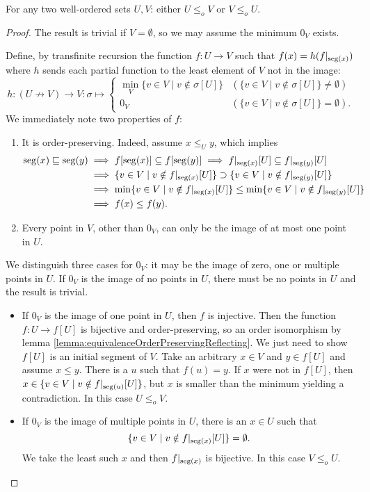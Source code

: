 \begin{theorem}\label{theorem:comparabilityWosets}
For any two well-ordered sets $U,V$: either $U\leq_o V$ or $V\leq_o U$.
\end{theorem}
\begin{proof}
The result is trivial if $V=\emptyset$, so we may assume the minimum $0_V$ exists.

Define, by transfinite recursion the function $f:U\to V$ such that $f(x) = h(f|_{\operatorname{seg}(x)})$ where $h$ sends each partial function to the least element of $V$ not in the image:
\[ h: (U\not\to V) \to V: \sigma \mapsto \begin{cases}
\min_V\{v\in V\;|\; v\notin \sigma[U]\} & (\{v\in V\;|\; v\notin \sigma[U]\} \neq \emptyset) \\
0_V  & (\{v\in V\;|\; v\notin \sigma[U]\} = \emptyset).
\end{cases} \]
We immediately note two properties of $f$:
\begin{enumerate}
\item It is order-preserving. Indeed, assume $x\leq_U y$, which implies
\begin{align*}
\operatorname{seg}(x) \sqsubseteq \operatorname{seg}(y) &\implies f[\operatorname{seg}(x)] \subseteq f[\operatorname{seg}(y)] \implies f|_{\operatorname{seg}(x)}[U] \subseteq f|_{\operatorname{seg}(y)}[U] \\
&\implies \{v\in V\;|\; v\notin f|_{\operatorname{seg}(x)}[U]\} \supset \{v\in V\;|\; v\notin f|_{\operatorname{seg}(y)}[U]\} \\
&\implies \min\{v\in V\;|\; v\notin f|_{\operatorname{seg}(x)}[U]\} \leq \min\{v\in V\;|\; v\notin f|_{\operatorname{seg}(y)}[U]\} \\ &\implies f(x) \leq f(y).
\end{align*}
\item Every point in $V$, other than $0_V$, can only be the image of at most one point in $U$.
\end{enumerate}
We distinguish three cases for $0_V$: it may be the image of zero, one or multiple points in $U$. If $0_V$ is the image of no points in $U$, there must be no points in $U$ and the result is trivial.
\begin{itemize}
\item If $0_V$ is the image of one point in $U$, then $f$ is injective. Then the function $f: U\to f[U]$ is bijective and order-preserving, so an order isomorphism by lemma \ref{lemma:equivalenceOrderPreservingReflecting}. We just need to show $f[U]$ is an initial segment of $V$. Take an arbitrary $x\in V$ and $y\in f[U]$ and assume $x\leq y$. There is a $u$ such that $f(u) = y$. If $x$ were not in $f[U]$, then $x\in\{v\in V\;|\; v\notin f|_{\operatorname{seg}(u)}[U]\}$, but $x$ is smaller than the minimum yielding a contradiction. In this case $U\leq_o V$.
\item If $0_V$ is the image of multiple points in $U$, there is an $x\in U$ such that
\[ \{v\in V\;|\; v\notin f|_{\operatorname{seg}(x)}[U]\} = \emptyset. \]
We take the least such $x$ and then $f|_{\operatorname{seg}(x)}$ is bijective. In this case $V \leq_o U$.
\end{itemize}
\end{proof}
